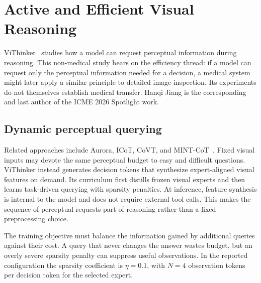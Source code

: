 \section{Active and Efficient Visual Reasoning}\label{sec:vithinker}
ViThinker~\citep{vithinker} studies how a model can request perceptual information during reasoning. This non-medical study bears on the efficiency thread: if a model can request only the perceptual information needed for a decision, a medical system might later apply a similar principle to detailed image inspection. Its experiments do not themselves establish medical transfer. Hanqi Jiang is the corresponding and last author of the ICME 2026 Spotlight work.

\subsection{Dynamic perceptual querying}
Related approaches include Aurora, ICoT, CoVT, and MINT-CoT~\citep{bigverdi2025perception,gao2025interleaved,qin2025covt,chen2025mintcot}. Fixed visual inputs may devote the same perceptual budget to easy and difficult questions. ViThinker instead generates decision tokens that synthesize expert-aligned visual features on demand. Its curriculum first distills frozen visual experts and then learns task-driven querying with sparsity penalties. At inference, feature synthesis is internal to the model and does not require external tool calls. This makes the sequence of perceptual requests part of reasoning rather than a fixed preprocessing choice.

The training objective must balance the information gained by additional queries against their cost. A query that never changes the answer wastes budget, but an overly severe sparsity penalty can suppress useful observations. In the reported configuration the sparsity coefficient is $\eta=0.1$, with $N=4$ observation tokens per decision token for the selected expert.

